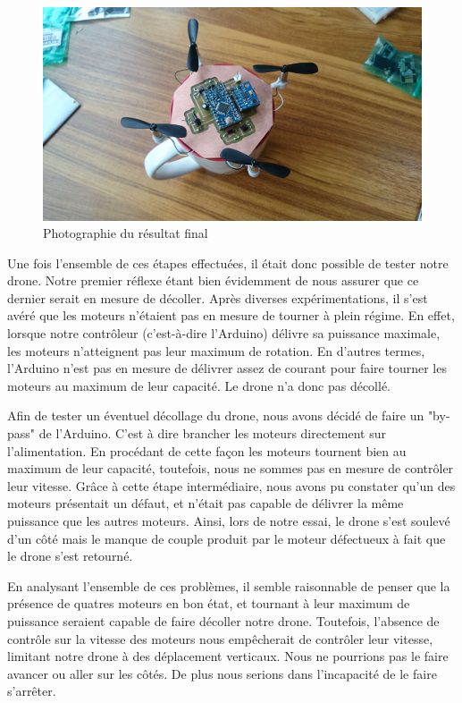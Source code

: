 \documentclass[a4paper,10pt]{report}
\begin{document}
	  \begin{figure}[htbp]
	    \centering
	    \includegraphics[scale = 0.1]{img/drone_photo.jpg}
	    \caption{Photographie du résultat final}
	    \label{droneres}
	  \end{figure}
	
	
	Une fois l'ensemble de ces étapes effectuées, il était donc possible de 
tester notre drone. Notre premier réflexe étant bien évidemment de nous assurer 
que ce dernier serait en mesure de décoller. Après diverses expérimentations, 
il s'est avéré que les moteurs n'étaient pas en mesure de tourner à plein 
régime. En effet, lorsque notre contrôleur (c'est-à-dire l'Arduino) délivre sa 
puissance maximale, les moteurs n'atteignent pas leur maximum de rotation. En 
d'autres termes, l'Arduino n'est pas en mesure de délivrer assez de courant 
pour faire tourner les moteurs au maximum de leur capacité. Le drone n'a donc 
pas décollé.

	Afin de tester un éventuel décollage du drone, nous avons décidé de 
faire un "by-pass" de l'Arduino. C'est à dire brancher les moteurs directement 
sur l'alimentation. En procédant de cette façon les moteurs tournent bien au 
maximum de leur capacité, toutefois, nous ne sommes pas en mesure de contrôler 
leur vitesse. Grâce à cette étape intermédiaire, nous avons pu constater qu'un 
des moteurs présentait un défaut, et n'était pas capable de délivrer la même 
puissance que les autres moteurs. Ainsi, lors de notre essai, le drone s'est 
soulevé d'un côté mais le manque de couple produit par le moteur défectueux à 
fait que le drone s'est retourné.

	  En analysant l'ensemble de ces problèmes, il semble raisonnable de 
penser que la présence de quatres moteurs en bon état, et tournant à leur 
maximum de puissance seraient capable de faire décoller notre drone. Toutefois, 
l'absence de contrôle sur la vitesse des moteurs nous empêcherait de contrôler 
leur vitesse, limitant notre drone à des déplacement verticaux. Nous ne 
pourrions pas le faire avancer ou aller sur les côtés. De plus nous serions 
dans l'incapacité de le faire s'arrêter.
\end{document}
